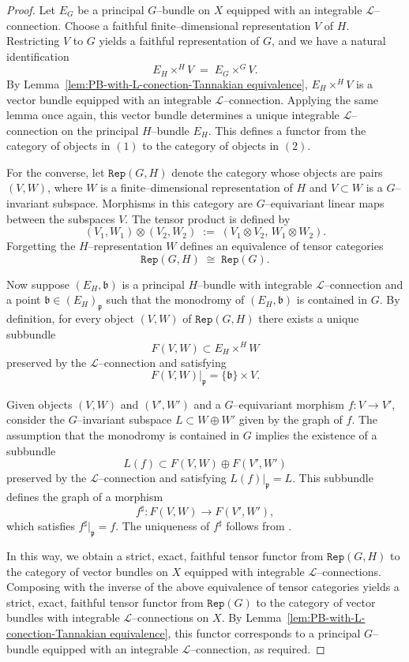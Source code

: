 \documentclass[12pt,reqno]{amsart}
\numberwithin{equation}{subsection}
\theoremstyle{definition}
\theoremstyle{theorem}
\begin{document}
\begin{proof}
	Let $E_{G}$ be a principal $G$--bundle on $X$ equipped with an integrable
	$\mathcal{L}$--connection. Choose a faithful finite--dimensional representation
	$V$ of $H$. Restricting $V$ to $G$ yields a faithful representation of $G$, and
	we have a natural identification
	\[
	E_{H} \times^{H} V \;=\; E_{G} \times^{G} V .
	\]
	By Lemma~\eqref{lem:PB-with-L-conection-Tannakian equivalence},
	$E_{H} \times^{H} V$ is a vector bundle equipped with an integrable
	$\mathcal{L}$--connection. Applying the same lemma once again, this vector
	bundle determines a unique integrable $\mathcal{L}$--connection on the
	principal $H$--bundle $E_{H}$. This defines a functor from the category of
	objects in $(1)$ to the category of objects in $(2)$.
	
	\medskip
	For the converse, let $\texttt{Rep}(G,H)$ denote the category whose objects are
	pairs $(V,W)$, where $W$ is a finite--dimensional representation of $H$ and
	$V \subset W$ is a $G$--invariant subspace. Morphisms in this category are
	$G$--equivariant linear maps between the subspaces $V$. The tensor product is
	defined by
	\[
	(V_{1},W_{1}) \otimes (V_{2},W_{2})
	\;:=\;
	(V_{1} \otimes V_{2},\, W_{1} \otimes W_{2}).
	\]
	Forgetting the $H$--representation $W$ defines an equivalence of tensor
	categories
	\[
	\texttt{Rep}(G,H) \;\cong\; \texttt{Rep}(G).
	\]
	
	Now suppose $(E_{H},\mathfrak{b})$ is a principal $H$--bundle with integrable
	$\mathcal{L}$--connection and a point $\mathfrak{b} \in (E_{H})_{\mathfrak{p}}$
	such that the monodromy of $(E_{H},\mathfrak{b})$ is contained in $G$. By
	definition, for every object $(V,W)$ of $\texttt{Rep}(G,H)$ there exists a unique
	subbundle
	\[
	F(V,W) \subset E_{H} \times^{H} W
	\]
	preserved by the $\mathcal{L}$--connection and satisfying
	\[
	F(V,W)|_{\mathfrak{p}} = \{\mathfrak{b}\} \times V .
	\]
	
	Given objects $(V,W)$ and $(V',W')$ and a $G$--equivariant morphism
	$f \colon V \to V'$, consider the $G$--invariant subspace
	$L \subset W \oplus W'$ given by the graph of $f$. The assumption that the
	monodromy is contained in $G$ implies the existence of a subbundle
	\[
	L(f) \subset F(V,W) \oplus F(V',W')
	\]
	preserved by the $\mathcal{L}$--connection and satisfying
	$L(f)|_{\mathfrak{p}} = L$. This subbundle defines the graph of a morphism
	\[
	f^{\sharp} \colon F(V,W) \longrightarrow F(V',W'),
	\]
	which satisfies $f^{\sharp}|_{\mathfrak{p}} = f$. The uniqueness of
	$f^{\sharp}$ follows from \cite[\S\,4, Lemma~4.9]{CT.Simpson-1994}.
	
	In this way, we obtain a strict, exact, faithful tensor functor from
	$\texttt{Rep}(G,H)$ to the category of vector bundles on $X$ equipped with
	integrable $\mathcal{L}$--connections. Composing with the inverse of the above
	equivalence of tensor categories yields a strict, exact, faithful tensor
	functor from $\texttt{Rep}(G)$ to the category of vector bundles with integrable
	$\mathcal{L}$--connections on $X$. By
	Lemma~\eqref{lem:PB-with-L-conection-Tannakian equivalence}, this functor
	corresponds to a principal $G$--bundle equipped with an integrable
	$\mathcal{L}$--connection, as required.
\end{proof}
\end{document}
